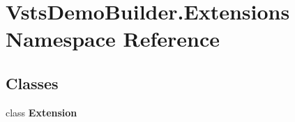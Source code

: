 \hypertarget{namespace_vsts_demo_builder_1_1_extensions}{}\section{Vsts\+Demo\+Builder.\+Extensions Namespace Reference}
\label{namespace_vsts_demo_builder_1_1_extensions}
\subsection*{Classes}
\begin{DoxyCompactItemize}
\item 
class {\bfseries Extension}
\end{DoxyCompactItemize}
